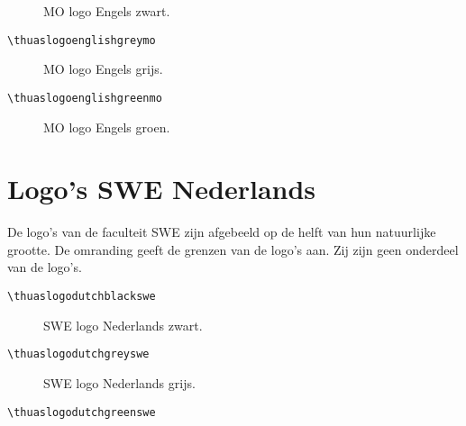 \documentclass[a4paper,12pt]{article}
\begin{document}
\begin{figure}[H]
\centering\fboxsep=0pt%
\fbox{%
\scalebox{0.7071}{\thuaslogoenglishblackmo}}
\caption{MO logo Engels zwart.}
\end{figure}

\begin{verbatim}
\thuaslogoenglishgreymo
\end{verbatim}

\begin{figure}[H]
\centering\fboxsep=0pt%
\fbox{%
\scalebox{0.7071}{\thuaslogoenglishgreymo}}
\caption{MO logo Engels grijs.}
\end{figure}

\begin{verbatim}
\thuaslogoenglishgreenmo
\end{verbatim}

\begin{figure}[H]
\centering\fboxsep=0pt%
\fbox{%
\scalebox{0.7071}{\thuaslogoenglishgreenmo}}
\caption{MO logo Engels groen.}
\end{figure}


\section{Logo's SWE Nederlands}
De logo's van de faculteit SWE zijn afgebeeld op de helft van hun natuurlijke grootte.
De omranding geeft de grenzen van de logo's aan. Zij zijn geen onderdeel
van de logo's.

\begin{verbatim}
\thuaslogodutchblackswe
\end{verbatim}

\begin{figure}[H]
\centering\fboxsep=0pt%
\fbox{%
\scalebox{0.7071}{\thuaslogodutchblackswe}}
\caption{SWE logo Nederlands zwart.}
\end{figure}

\begin{verbatim}
\thuaslogodutchgreyswe
\end{verbatim}

\begin{figure}[H]
\centering\fboxsep=0pt%
\fbox{%
\scalebox{0.7071}{\thuaslogodutchgreyswe}}
\caption{SWE logo Nederlands grijs.}
\end{figure}

\begin{verbatim}
\thuaslogodutchgreenswe
\end{verbatim}
\end{document}
